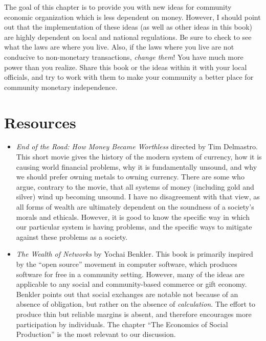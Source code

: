 \begin{infonote}
The goal of this chapter is to provide you with new ideas for community
economic organization which is less dependent on money.  However, I
should point out that the implementation of these ideas (as well as other
ideas in this book) are highly dependent on local and national regulations.
Be sure to check to see what the laws are where you live.  Also, if the
laws where you live are not conducive to non-monetary transactions, 
\textit{change them}!  You have much more power than you realize.  Share
this book or the ideas within it with your local officials, and try to
work with them to make your community a better place for community 
monetary independence.
\end{infonote}

\section{Resources}
\begin{itemize}
\item
\textit{End of the Road: How Money Became Worthless} directed by Tim Delmastro.  This short movie
gives the history of the modern system of currency, how it is causing world financial problems,
why it is fundamentally unsound, and why we should prefer owning metals to owning currency.  
There are some who argue, contrary to the movie, that all systems 
of money (including gold and silver) wind up becoming unsound.  I have no disagreement with that view,
as all forms of wealth are ultimately dependent on the soundness of a society's morals and ethicals.
However, it is good to know the specific way in which our particular system is having problems, and
the specific ways to mitigate against these problems as a society.
\item
\textit{The Wealth of Networks} by Yochai Benkler.  This book is primarily inspired by the ``open source'' movement
in computer software, which produces software for free in a community setting.  However, many of the ideas
are applicable to any social and community-based commerce or gift economy.  Benkler points out that social
exchanges are notable not because of an absence of obligation, but rather on the absence of \textit{calculation}.
The effort to produce thin but reliable margins is absent, and therefore encourages more participation by
individuals.  The chapter ``The Economics of Social Production'' is the most relevant to our discussion.
\end{itemize}
